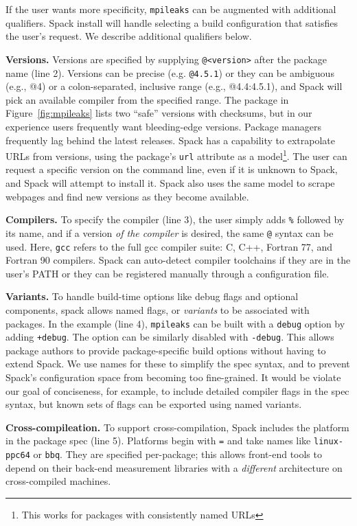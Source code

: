 If the user wants more specificity, {\tt mpileaks} can be augmented with additional
qualifiers.  Spack install will handle selecting a build configuration that satisfies
the user's request.  We describe additional qualifiers below.

{\bf Versions.}
Versions are specified by supplying {\tt @<version>} after the package name (line 2). 
Versions can be precise (e.g. {\tt @4.5.1}) or 
they can be ambiguous (e.g., @4) or a colon-separated, inclusive range (e.g., @4.4:4.5.1),
and Spack will pick an available compiler from the specified range.
The package in Figure~\ref{fig:mpileaks} lists two ``safe'' versions with checksums, but
in our experience users frequently want bleeding-edge versions.  Package managers
frequently lag behind the latest releases. 
Spack has a capability to extrapolate URLs from versions,
using the package's {\tt url} attribute as a model\footnote{This works
for packages with consistently named URLs}.  The user can request a specific
version on the command line, even if it is unknown to Spack,
and Spack will attempt to install it.  Spack also uses the same
model to scrape webpages and find new versions as they become available.

{\bf Compilers.}
To specify the compiler (line 3), the user
simply adds {\tt \%} followed by its name, and if a version {\it of the compiler} 
is desired, the same {\tt @} syntax can be used.  Here, {\tt gcc} refers to the full
gcc compiler suite: C, C++, Fortran 77, and Fortran 90 compilers.  Spack can auto-detect
compiler toolchains if they are in the user's PATH or they can be registered manually
through a configuration file.

{\bf Variants.}
To handle build-time options like debug flags and optional components, spack
allows named flags, or {\it variants} to be associated with packages.  
In the example (line 4), {\tt mpileaks} can be built with a {\tt debug} option by
adding {\tt +debug}.  The option can be similarly disabled with {\tt -debug}.  
This allows package authors to provide package-specific build options without 
having to extend Spack.  We use names for these to simplify the spec
syntax, and to prevent Spack's configuration space from becoming too fine-grained.
It would be violate our goal of conciseness, for example, to include detailed 
compiler flags in the spec syntax, but known sets of flags can be exported using
named variants.

{\bf Cross-compileation.}
To support cross-compilation, Spack includes the platform in the package spec (line 5).
Platforms begin with {\tt =} and take names like {\tt linux-ppc64} or {\tt bbq}.  They are
specified per-package; this allows front-end tools to depend on their back-end measurement
libraries with a {\it different} architecture on cross-compiled machines.

